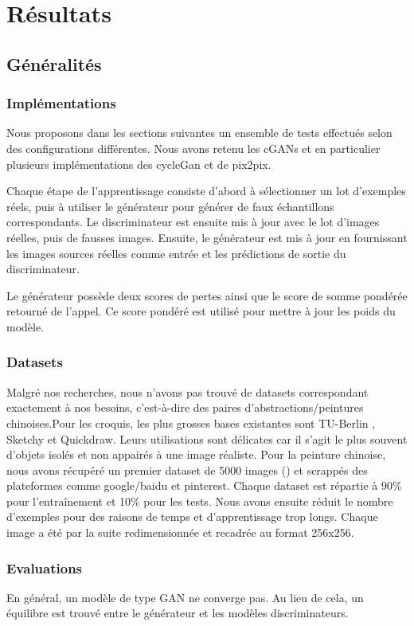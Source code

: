 \documentclass[a4paper, 12pt]{report}
\begin{document}
\chapter{Résultats}


\section{Généralités}

\subsection{Implémentations}
Nous proposons dans les sections suivantes un ensemble de tests effectués selon des configurations différentes. Nous avons retenu les cGANs et en particulier plusieurs implémentations des cycleGan et de pix2pix.

Chaque étape de l'apprentissage consiste d’abord à sélectionner un lot d’exemples réels, puis à utiliser le générateur pour générer de faux échantillons correspondants. Le discriminateur est ensuite mis à jour avec le lot d’images réelles, puis de fausses images. Ensuite, le générateur est mis à jour en fournissant les images sources réelles comme entrée et les prédictions de sortie du discriminateur.

Le générateur possède deux scores de pertes ainsi que le score de somme pondérée retourné de l’appel. Ce score pondéré est utilisé pour mettre à jour les poids du modèle.


\subsection{Datasets}
Malgré nos recherches, nous n'avons pas trouvé de datasets correspondant exactement à nos besoins, c'est-à-dire des paires d'abstractions/peintures chinoises.Pour les croquis, les plus grosses bases existantes sont TU-Berlin \cite{eitz2012hdhso}, Sketchy \cite{sketchy2016} et Quickdraw. Leurs utilisations sont délicates car il s'agit le plus souvent d'objets isolés et non appairés à une image réaliste. Pour la peinture chinoise, nous avons récupéré un premier dataset de 5000 images (\cite{ychen93}) et scrappés des plateformes comme google/baidu et pinterest. Chaque dataset est répartie à 90\% pour l'entraînement et 10\% pour les tests. Nous avons ensuite réduit le nombre d'exemples pour des raisons de temps et d'apprentissage trop longs. Chaque image a été par la suite redimensionnée et recadrée au format 256x256.


\subsection{Evaluations}
En général, un modèle de type GAN ne converge pas. Au lieu de cela, un équilibre est trouvé entre le générateur et les modèles discriminateurs.
\end{document}
